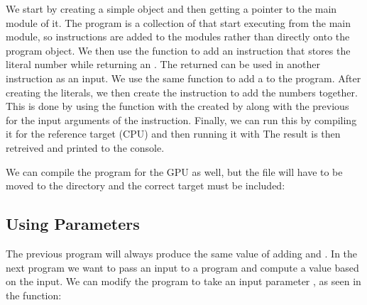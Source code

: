 \documentclass[letterpaper,10pt,english]{sphinxmanual}
\begin{document}
\sphinxAtStartPar
We start by creating a simple  object and then getting a pointer to the main module of it.
The program is a collection of  that start executing from the main module, so instructions are added to the modules rather than directly onto the program object.
We then use the  function to add an instruction that stores the literal number  while returning an .
The returned  can be used in another instruction as an input.
We use the same  function to add a  to the program.
After creating the literals, we then create the instruction to add the numbers together.
This is done by using the  function with the   created by  along with the previous   for the input arguments of the instruction.
Finally, we can run this  by compiling it for the reference target (CPU) and then running it with 
The result is then retreived and printed to the console.

\sphinxAtStartPar
We can compile the program for the GPU as well, but the file will have to be moved to the  directory and the correct target must be included:

\begin{sphinxVerbatim}[commandchars=\\\{\}]
\end{sphinxVerbatim}


\subsection{Using Parameters}
\label{\detokenize{dev_intro:using-parameters}}
\sphinxAtStartPar
The previous program will always produce the same value of adding  and .
In the next program we want to pass an input to a program and compute a value based on the input.
We can modify the program to take an input parameter , as seen in the  function:
\end{document}
